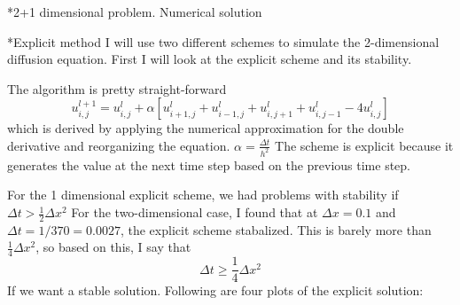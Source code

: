 \documentclass[a4paper, 12pt, titlepage]{article}
\newcommand{\f}[2]{\frac{#1}{#2}}
\newcommand{\beq}{\begin{equation*}}
\newcommand{\eeq}{\end{equation*}}
\begin{document}
  \begin{section}*{2+1 dimensional problem. Numerical solution}
  
  \begin{subsection}*{Explicit method}
    I will use two different schemes to simulate the 2-dimensional diffusion equation. First I will look at 
    the explicit scheme and its stability. 
    
    The algorithm is pretty straight-forward 
    \beq u_{i,j}^{l+1} = u_{i,j}^l + \alpha[u_{i+1,j}^l + u_{i-1,j}^l + u_{i,j+1}^l + u_{i,j-1}^l - 4u_{i,j}^l] \eeq
    which is derived by applying the numerical approximation for the double derivative and reorganizing the
    equation. $\alpha = \frac{\Delta t}{h^2} $ The scheme is explicit because it generates the value at the 
    next time step based on the previous time step. 
    
    For the 1 dimensional explicit scheme, we had problems with stability if $\Delta t > \f{1}{2}\Delta x^2$
    For the two-dimensional case, I found that at $\Delta x = 0.1$ and $\Delta t = 1/370 = 0.0027$, the 
    explicit scheme stabalized. This is barely more than $\f{1}{4}\Delta x^2$, so based on this, I say that
    \beq \Delta t \geq \f{1}{4} \Delta x^2 \eeq 
    If we want a stable solution. 
    Following are four plots of the explicit solution: 
    

\end{subsection}
\end{section}
\end{document}

